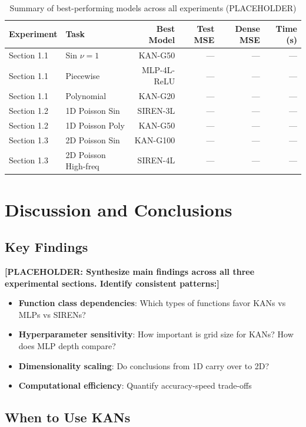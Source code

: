 \documentclass[11pt,a4paper]{article}
\begin{document}
\begin{table}[htbp]
\centering
\caption{Summary of best-performing models across all experiments (PLACEHOLDER)}
\label{tab:summary}
\begin{tabular}{llrrrr}
\toprule
\textbf{Experiment} & \textbf{Task} & \textbf{Best Model} & \textbf{Test MSE} & \textbf{Dense MSE} & \textbf{Time (s)} \\
\midrule
Section 1.1 & Sin $\nu=1$ & KAN-G50 & --- & --- & --- \\
Section 1.1 & Piecewise & MLP-4L-ReLU & --- & --- & --- \\
Section 1.1 & Polynomial & KAN-G20 & --- & --- & --- \\
\midrule
Section 1.2 & 1D Poisson Sin & SIREN-3L & --- & --- & --- \\
Section 1.2 & 1D Poisson Poly & KAN-G50 & --- & --- & --- \\
\midrule
Section 1.3 & 2D Poisson Sin & KAN-G100 & --- & --- & --- \\
Section 1.3 & 2D Poisson High-freq & SIREN-4L & --- & --- & --- \\
\bottomrule
\end{tabular}
\end{table}

\section{Discussion and Conclusions}
\label{sec:discussion}

\subsection{Key Findings}

\textbf{[PLACEHOLDER: Synthesize main findings across all three experimental sections. Identify consistent patterns:]}
\begin{itemize}
    \item \textbf{Function class dependencies}: Which types of functions favor KANs vs MLPs vs SIRENs?
    \item \textbf{Hyperparameter sensitivity}: How important is grid size for KANs? How does MLP depth compare?
    \item \textbf{Dimensionality scaling}: Do conclusions from 1D carry over to 2D?
    \item \textbf{Computational efficiency}: Quantify accuracy-speed trade-offs
\end{itemize}

\subsection{When to Use KANs}
\end{document}
